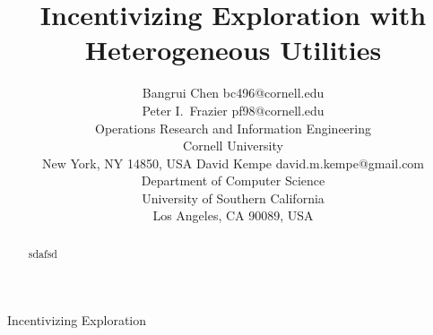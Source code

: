 \documentclass[twoside,11pt]{article}
\begin{document}
\title{Incentivizing Exploration with Heterogeneous Utilities}

\author{\name Bangrui Chen \email bc496@cornell.edu \\
\name Peter I.\ Frazier \email pf98@cornell.edu \\
\addr Operations Research and Information Engineering\\
Cornell University\\
New York, NY 14850, USA
\AND
\name David Kempe \email david.m.kempe@gmail.com  \\
\addr Department of Computer Science\\
University of Southern California\\
Los Angeles, CA 90089, USA}

\editor{}

\maketitle

\begin{abstract}
sdafsd
\end{abstract}

\begin{keywords}
Incentivizing Exploration
\end{keywords}

     












\newpage

\appendix



\vskip 0.2in


\end{document}
